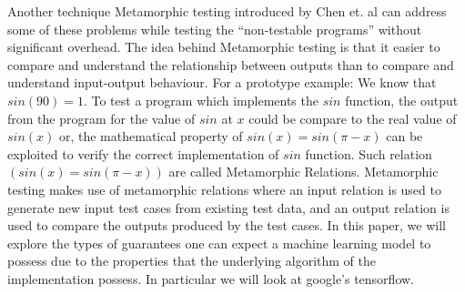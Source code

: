 Another technique Metamorphic testing introduced by Chen et. al can address some of these problems while testing the \enquote{non-testable programs} without significant overhead. The idea behind Metamorphic testing is that it easier to compare and understand the relationship between outputs than to compare and understand input-output behaviour. For a prototype example: We know that $sin(90)=1$. To test a program which implements the $sin$ function, the output from the program for the value of $sin$ at $x$ could be compare to the real value of $sin(x)$ or, the mathematical property of $sin(x) = sin(\pi-x)$ can be exploited to verify the correct implementation of $sin$ function. Such relation $(sin(x) = sin(\pi-x))$ are called Metamorphic Relations. Metamorphic testing makes use of metamorphic relations where an input relation is used to generate new input test cases from existing test data, and an output relation is used to compare the outputs produced by the test cases.\newline
In this paper, we will explore the types of guarantees one can expect a machine learning model to possess due to the properties that the underlying algorithm of the implementation possess. In particular we will look at google's tensorflow.

